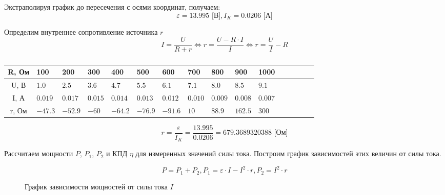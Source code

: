 Экстраполируя график до пересечения с осями координат, получаем:
\[
\varepsilon = 13.995 \text{ [В]}, I_K = 0.0206 \text{ [А]}
\]

Определим внутреннее сопротивление источника $r$
\[
I = \frac{U}{R+r} \Leftrightarrow r = \frac{U-R \cdot I}{I} \Leftrightarrow r= \frac{U}{I} - R
\]

\begin{table}[h]
	\caption{}
	\begin{tabularx}{\textwidth}{|c|X|X|X|X|X|X|X|X|X|X|X|X|X|X|X|}
		\hline
		R, Ом & 100 & 200 & 300 & 400 & 500 & 600 & 700 & 800 & 900 & 1000 \\ \hline
		U, В & $1.0$ & $2.5$ & $3.6$ & $4.7$ & $5.5$ & $6.1$ & $7.1$ & $8.0$ & $8.5$ & $9.1$ \\ \hline
		I, А & $0.019$ & $0.017$ & $0.015$ & $0.014$ & $0.013$ & $0.012$ & $0.010$ & $0.009$ & $0.008$ & $0.007$ \\ \hline
		r, Ом & $-47.3$ & $-52.9$ & $-60$ & $-64.2$ & $-76.9$ & $-91.6$ & $10$ & $88.9$ & $162.5$ & $300$ \\ \hline
	\end{tabularx}
\end{table}

\[
r = \frac{\varepsilon}{I_K} = \frac{13.995}{0.0206} = 679.3689320388 \text{ [Ом]}
\]

Рассчитаем мощности $P$, $P_1$, $P_2$ и КПД $\eta$ для измеренных значений силы тока. Построим график зависимостей этих величин от силы тока.

\[
P = P_1+ P_2, P_1 = \varepsilon \cdot I  - I^2\cdot r, P_2 = I^2 \cdot r
\]

\begin{figure}[h]
	\centering
	\caption{График зависимости мощностей от силы тока $I$}
\end{figure}